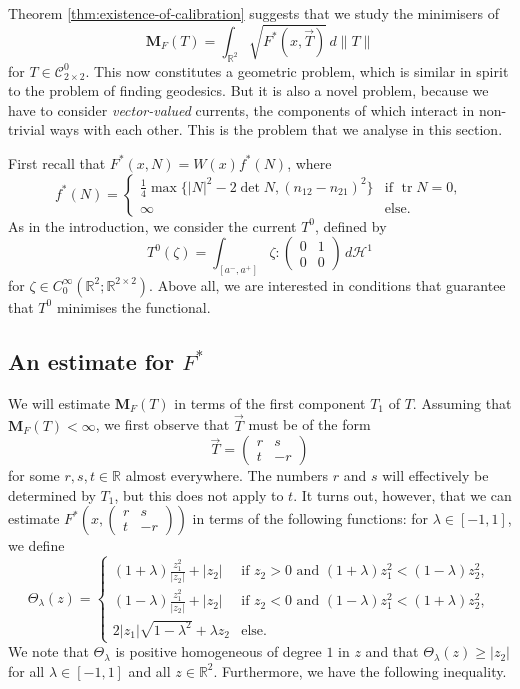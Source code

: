 \documentclass[a4paper]{article}
\newcommand{\R}{\mathbb{R}}
\newcommand{\Ha}{\mathcal{H}}
\newcommand{\M}{\mathbf{M}}
\newcommand{\ncrt}{\mathcal{C}}
\DeclareMathOperator{\tr}{tr}
\theoremstyle{definition}
\theoremstyle{remark}
\begin{document}
Theorem \ref{thm:existence-of-calibration} suggests that we study the minimisers of
\[
\M_F(T) = \int_{\R^2} \sqrt{F^*(x, \vec{T})} \, d\|T\|
\]
for $T \in \ncrt_{2 \times 2}^0$. This now constitutes a geometric problem, which
is similar in spirit to the problem of finding geodesics. But it is also a
novel problem, because we have to consider \emph{vector-valued} currents,
the components of which interact in non-trivial ways with each other.
This is the problem that we analyse in this section.

First recall that $F^*(x, N) = W(x) f^*(N)$, where
\[
f^*(N) = \begin{cases}
\frac{1}{4} \max\{|N|^2 - 2 \det N, (n_{12} - n_{21})^2\} & \text{if $\tr N = 0$}, \\
\infty & \text{else}.
\end{cases}
\]
As in the introduction, we consider the current $T^0$, defined by
\[
T^0(\zeta) = \int_{[a^-, a^+]} \zeta : \begin{pmatrix} 0 & 1 \\ 0 & 0 \end{pmatrix} \, d\Ha^1
\]
for $\zeta \in C_0^\infty(\R^2; \R^{2 \times 2})$. Above all, we are interested
in conditions that guarantee that $T^0$ minimises the functional.



\subsection{An estimate for $F^*$}

We will estimate $\M_F(T)$ in terms of the first component $T_1$ of $T$.
Assuming that $\M_F(T) < \infty$, we first observe that $\vec{T}$ must be
of the form
\[
\vec{T} = \begin{pmatrix} r & s \\ t & -r \end{pmatrix}
\]
for some $r, s, t \in \R$ almost everywhere. The numbers $r$ and $s$ will
effectively be determined by $T_1$, but this does not apply to $t$.
It turns out, however, that we can estimate
$F^*(x, (\begin{smallmatrix} r & s \\ t & -r \end{smallmatrix}))$ in terms
of the following functions: for $\lambda \in [-1, 1]$, we define
\[
\Theta_\lambda(z) = \begin{cases}
(1 + \lambda) \frac{z_1^2}{|z_2|} + |z_2| & \text{if $z_2 > 0$ and $(1 + \lambda) z_1^2 < (1 - \lambda) z_2^2$}, \\
(1 - \lambda) \frac{z_1^2}{|z_2|} + |z_2| & \text{if $z_2 < 0$ and $(1 - \lambda) z_1^2 < (1 + \lambda) z_2^2$}, \\
2|z_1| \sqrt{1 - \lambda^2} + \lambda z_2 & \text{else}.
\end{cases}
\]
We note that $\Theta_\lambda$ is positive homogeneous of degree $1$ in $z$
and that $\Theta_\lambda(z) \ge |z_2|$ for all $\lambda \in [-1, 1]$
and all $z \in \R^2$. Furthermore, we have the following inequality.
\end{document}
